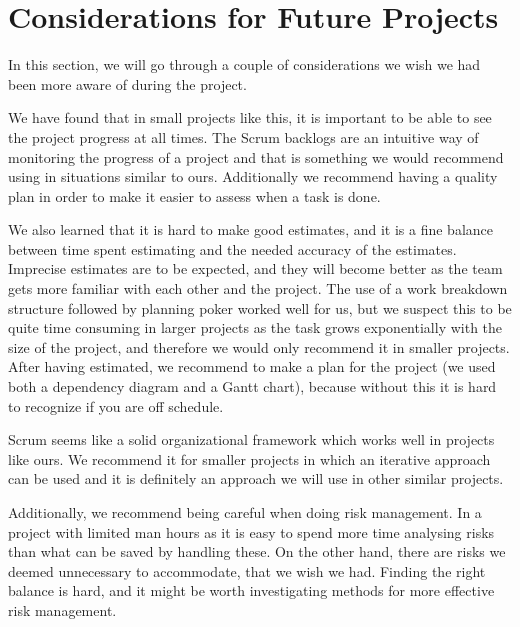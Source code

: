 \section{Considerations for Future Projects}
In this section, we will go through a couple of considerations we wish we had
been more aware of during the project.

We have found that in small projects like this, it is important to be able to
see the project progress at all times. The Scrum backlogs are an intuitive way
of monitoring the progress of a project and that is something we would
recommend using in situations similar to ours. Additionally we recommend having
a quality plan in order to make it easier to assess when a task is done.

We also learned that it is hard to make good estimates, and it is a fine balance
between time spent estimating and the needed accuracy of the estimates. 
Imprecise estimates are to be expected, and they will become better as the team
gets more familiar with each other and the project. The use of a work breakdown
structure followed by planning poker worked well for us, but we suspect this to
be quite time consuming in larger projects as the task grows exponentially with
the size of the project, and therefore we would only recommend it in smaller
projects. After having estimated, we recommend to make a plan for the project
(we used both a dependency diagram and a Gantt chart), because without this it is hard to recognize if you are off schedule.

Scrum seems like a solid organizational framework which works well in projects
like ours. We recommend it for smaller projects in which an iterative approach
can be used and it is definitely an approach we will use in other similar
projects.

Additionally, we recommend being careful when doing risk management. In a
project with limited man hours as it is easy to spend more time analysing risks
than what can be saved by handling these. On the other hand, there are risks we
deemed unnecessary to accommodate, that we wish we had. Finding the right
balance is hard, and it might be worth investigating methods for more effective risk
management.
